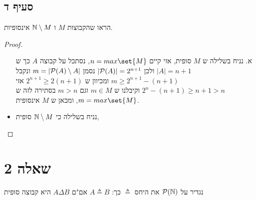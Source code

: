 \documentclass{article}
\DeclarePairedDelimiter\set\{\}
\begin{document}
	\subsection*{סעיף ד}
	הראו שהקבוצות $M$ ו $\mathbb{N} \setminus M$ אינסופיות.
	\begin{proof}
		\begin{itemize}
			\item[א.] נניח בשלילה ש $M$ סופית, אזי קיים $n = max\set{M}$, נסתכל על קבוצה $A$ כך ש $|A| = n+1$ ולכן $\left| \mathcal{P}(A) \right| = 2^{n+1}$
			נסמן $m = \left| \mathcal{P}(A) \setminus A \right|$ ונקבל $m \geq 2^{n+1} - (n+1)$ ומכיוון ש $2^{n+1} \geq 2(n+1)$ אזי $2^n - (n+1) \geq n+1 > n$ וקיבלנו ש $m \in M$ וגם $m > n$ בסתירה לזה ש $m = max\set{M}$, ומכאן ש $M$ אינסופית.
			\item נניח בשלילה כי $\mathbb{N} \setminus M$ סופית,
		\end{itemize}
	\end{proof}

	\section*{שאלה 2}
	נגדיר על $\mathcal{P}(\mathbb{N})$ את היחס $\triangleq$ כך: $A \triangleq B$ אם"ם $A \Delta B$ היא קבוצה סופית
\end{document}

